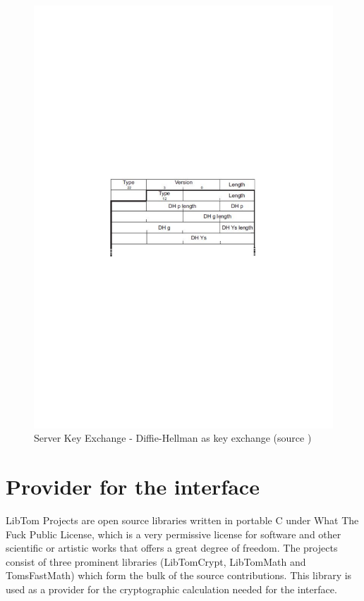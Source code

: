 \begin{figure}[!ht]
\centering
\includegraphics[trim=2cm 12cm 0cm 12cm]{figures/srv_key_exg.pdf}
\caption{Server Key Exchange - Diffie-Hellman as key exchange (source
\cite{book2})}
\label{fig:srv_key_exg}
\end{figure}

\section{Provider for the interface}

 LibTom Projects are open source libraries written in portable C under What
 The Fuck Public License, which is a very permissive license for software and
 other scientific or artistic works that offers a great degree of freedom.
 The projects consist of three prominent libraries (LibTomCrypt, LibTomMath and
 TomsFastMath) which form the bulk of the source contributions.
 This \tomcrypt library is used as a provider for the cryptographic calculation
 needed for the interface.

